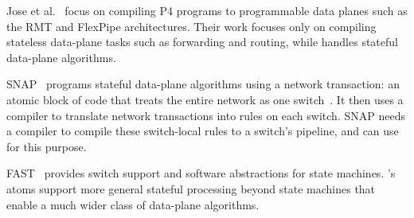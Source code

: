 Jose et al.~\cite{lavanya_compiler} focus on compiling P4 programs to
programmable data planes such as the RMT and FlexPipe architectures. Their work
focuses only on compiling stateless data-plane tasks such as forwarding and
routing, while \pktlanguage handles stateful data-plane algorithms.

SNAP~\cite{snap} programs stateful data-plane algorithms using a network
transaction: an atomic block of code that treats the entire network as one
switch~\cite{onebigswitch}. It then uses a compiler to translate network
transactions into rules on each switch. SNAP needs a compiler to compile
these switch-local rules to a switch's pipeline, and can use \pktlanguage for
this purpose.

FAST~\cite{fast} provides switch
support and software abstractions for state machines. \absmachine's atoms
support more general stateful processing beyond state machines that enable a
much wider class of data-plane algorithms.
